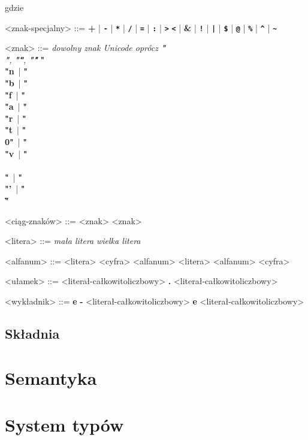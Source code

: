 \documentclass[12pt]{article}
\begin{document}
gdzie\\

\begin{grammar}

<znak-specjalny> ::=
    \textbf{+}
    | \textbf{\texttt{-}}
    | \textbf{\texttt{*}}
    | \textbf{\texttt{/}}
    | \textbf{\texttt{=}}
    | \textbf{\texttt{:}}
    | \textbf{\texttt{\textgreater}}
    \alt \textbf{\texttt{\textless}}
    | \textbf{\&}
    | \textbf{\texttt{!}}
    | \textbf{\texttt{|}}
    | \textbf{\texttt{\$}}
    | \textbf{\texttt{@}}
    | \textbf{\texttt{\%}}
    | \textbf{\texttt{\^}}
    | \textbf{\texttt{\~}}

    <znak> ::= 
        \textit{dowolny znak Unicode oprócz 
            \textbf{"\\"}, \textbf{"\""}, \textbf{"\'"}}
        \alt \textbf{"\\"n}\,
        | \textbf{"\\"b}\,
        | \textbf{"\\"f}\,
        | \textbf{"\\"a}\,
        | \textbf{"\\"r}\,
        | \textbf{"\\"t}\,
        | \textbf{"\\0"}\,
        | \textbf{"\\"v}\,
        | \textbf{"\\\\"}\,
        | \textbf{"\\"'}\,
        | \textbf{"\\\""}\,

    <ciąg-znaków> ::=
        <znak>
         <znak>
    
    <litera> ::=
        \textit{mała litera}
        \alt \textit{wielka litera}

    <alfanum> ::=
        <litera>
        \alt <cyfra>
        \alt <alfanum> <litera>
        \alt <alfanum> <cyfra>

    <ułamek> ::=
        <literał-całkowitoliczbowy> \textbf{.} <literał-całkowitoliczbowy>
    
    <wykładnik> ::=
        \textbf{e} \textbf{-} <literał-całkowitoliczbowy>
        \alt \textbf{e} <literał-całkowitoliczbowy>

\end{grammar}

\subsection{Składnia}

\begin{grammar}




\end{grammar}

\section{Semantyka}

\section{System typów}
\end{document}

